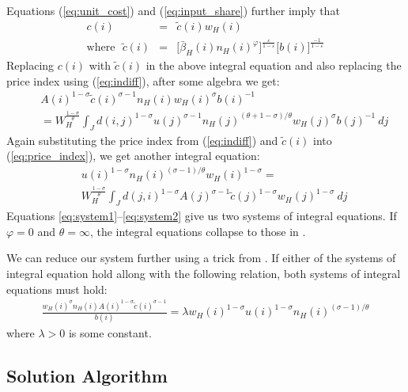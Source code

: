 \documentclass{article}
\begin{document}
Equations (\ref{eq:unit_cost}) and (\ref{eq:input_share}) further imply that 
\begin{eqnarray}\label{eq:ctilde}
	c(i) & = & \tilde{c}(i) w_H(i) \nonumber \\
    \mbox{where}~~~ \tilde{c}(i) & = & 
	\Big[\bar{\beta}_H(i) n_H(i)^{\varphi}\Big] ^{\frac{\varepsilon}{1-\varepsilon}} \Big[b(i)\Big]^{\frac{-1}{1-\varepsilon}}
\end{eqnarray}
Replacing $c(i)$ with $\tilde{c}(i)$ in the above integral equation and also replacing the price index using (\ref{eq:indiff}), after some algebra we get:
\begin{eqnarray}\label{eq:system1}
	& & A(i)^{1-\sigma} \tilde{c}(i)^{\sigma-1} n_H(i)  w_H(i)^{\sigma}  b(i)^{-1}  \nonumber \\
	& & =  
    W_H^{\frac{1-\sigma}{\theta}}
	\int_J d(i,j)^{1-\sigma} u(j)^{\sigma-1} n_H(j)^{(\theta+1-\sigma)/\theta} w_H(j)^{\sigma} b(j)^{-1}  ~dj
\end{eqnarray}
Again substituting the price index from (\ref{eq:indiff}) and $\tilde{c}(i)$ into (\ref{eq:price_index}), we get another integral equation: 
\begin{eqnarray}\label{eq:system2}
 	& &  u(i)^{1-\sigma} n_H(i)^{(\sigma-1)/\theta} w_H(i)^{1-\sigma}  = \nonumber \\ 
 	& & 
    W_H^{\frac{1-\sigma}{\theta}}
 	\int_J  d(j,i)^{1-\sigma} A(j)^{\sigma-1}  \tilde{c}(j)^{1-\sigma} w_H(j)^{1-\sigma}
 	~ dj
\end{eqnarray}
Equations \ref{eq:system1}--\ref{eq:system2} give us two systems of integral equations. If $\varphi=0$ and $\theta=\infty$, the integral equations collapse to those in \citet{allen2014trade}. 

We can reduce our system further using a trick from \citet{allen2014trade}.  If either of the systems of integral equation hold allong with the following relation, both systems of integral equations must hold:
\begin{eqnarray}\label{eq:systems_relation}
	\frac{w_H(i)^{\sigma}n_H(i)A(i)^{1-\sigma}\tilde{c}(i)^{\sigma-1}}{b(i)} = \lambda w_H(i)^{1-\sigma} u(i)^{1-\sigma} n_H(i)^{(\sigma-1)/\theta}
\end{eqnarray}
where $\lambda > 0$ is some constant.

\subsection{Solution Algorithm}
\end{document}
